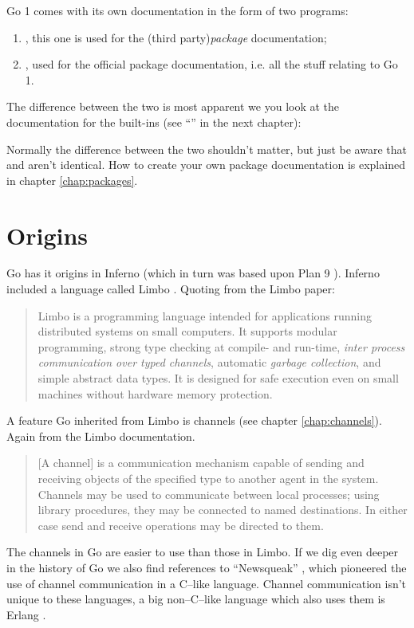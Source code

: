 Go 1 comes with its own documentation in the form of two programs:
\begin{enumerate}
    \item {}, this one is used for the (third party){}\emph{package} documentation;
\item {}, used for the official package documentation, i.e. all the stuff
relating to Go 1.
\end{enumerate}

The difference between the two is most apparent we you look at the documentation
for the built-ins (see ``'' in the next chapter):
\begin{display}
\pr {}   
\pr {}    
\end{display}

Normally the difference between the two shouldn't matter, but just be aware
that  and  aren't identical.
How to create your own package documentation is explained in chapter \ref{chap:packages}.

\section{Origins}
Go has it origins in Inferno \cite{inferno} (which in turn was based
upon Plan 9 \cite{plan9}). Inferno included a language called Limbo
\cite{limbo}. Quoting from the Limbo paper:
\begin{quote}
Limbo is a programming language intended for applications running
distributed systems on small computers. It supports modular programming,
strong type checking at compile- and run-time, \emph{inter process
communication over typed channels}, automatic \emph{garbage collection}, and
simple abstract data types. It is designed for safe execution even on
small machines without hardware memory protection.
\end{quote}
A feature Go inherited from Limbo is channels (see chapter
\ref{chap:channels}). Again from the Limbo documentation.
\begin{quote}
[A channel] is a communication mechanism capable of sending and receiving objects of
the specified type to another agent in the system. Channels may be used
to communicate between local processes; using library procedures, they
may be connected to named destinations. In either case send and receive
operations may be directed to them.
\end{quote}
The channels in Go are easier to use than those in Limbo.
If we dig even deeper in the history of Go we also find references
to ``Newsqueak'' \cite{newsqueak}, which pioneered the use of 
channel communication in a C--like language. Channel
communication isn't unique to these languages, a big non--C--like
language which also uses them is Erlang \cite{erlang}.

